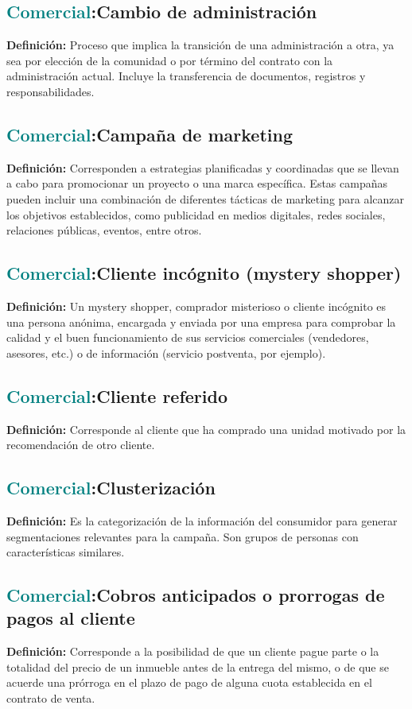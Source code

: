 \documentclass[12pt]{article}
\begin{document}
\subsection{\textcolor{teal}{Comercial}:{Cambio de administración}}
\textbf{Definición:} Proceso que implica la transición de una administración a otra, ya sea por elección de la comunidad o por término del contrato con la administración actual. Incluye la transferencia de documentos, registros y responsabilidades.
\subsection{\textcolor{teal}{Comercial}:{Campaña de marketing}}
\textbf{Definición:} Corresponden a estrategias planificadas y coordinadas que se llevan a cabo para promocionar un proyecto o una marca específica. Estas campañas pueden incluir una combinación de diferentes tácticas de marketing para alcanzar los objetivos establecidos, como publicidad en medios digitales, redes sociales, relaciones públicas, eventos, entre otros.
\subsection{\textcolor{teal}{Comercial}:{Cliente incógnito (mystery shopper)}}
\textbf{Definición:} Un mystery shopper, comprador misterioso o cliente incógnito es una persona anónima, encargada y enviada por una empresa para comprobar la calidad y el buen funcionamiento de sus servicios comerciales (vendedores, asesores, etc.) o de información (servicio postventa, por ejemplo).
\subsection{\textcolor{teal}{Comercial}:{Cliente referido}}
\textbf{Definición:} Corresponde al cliente que ha comprado una unidad motivado por la recomendación de otro cliente.
\subsection{\textcolor{teal}{Comercial}:{Clusterización}}
\textbf{Definición:} Es la categorización de la información del consumidor para generar segmentaciones relevantes para la campaña. Son grupos de personas con características similares.
\subsection{\textcolor{teal}{Comercial}:{Cobros anticipados o prorrogas de pagos al cliente}}
\textbf{Definición:} Corresponde a la posibilidad de que un cliente pague parte o la totalidad del precio de un inmueble antes de la entrega del mismo, o de que se acuerde una prórroga en el plazo de pago de alguna cuota establecida en el contrato de venta. 
\end{document}
